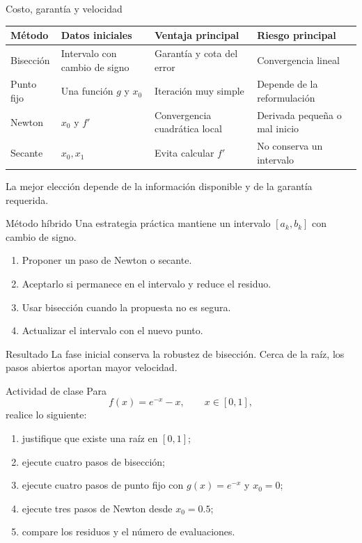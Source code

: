 \documentclass[aspectratio=169,12pt]{beamer}
\begin{document}
\begin{frame}{Costo, garantía y velocidad}
\centering
\small
\begin{tabular}{p{2.2cm}p{2.5cm}p{2.6cm}p{2.6cm}}
\toprule
Método & Datos iniciales & Ventaja principal & Riesgo principal \\
\midrule
Bisección & Intervalo con cambio de signo & Garantía y cota del error & Convergencia lineal \\
Punto fijo & Una función $g$ y $x_0$ & Iteración muy simple & Depende de la reformulación \\
Newton & $x_0$ y $f'$ & Convergencia cuadrática local & Derivada pequeña o mal inicio \\
Secante & $x_0,x_1$ & Evita calcular $f'$ & No conserva un intervalo \\
\bottomrule
\end{tabular}
\normalsize
\vspace{0.35cm}

La mejor elección depende de la información disponible y de la garantía requerida.
\end{frame}

\begin{frame}{Método híbrido}
Una estrategia práctica mantiene un intervalo $[a_k,b_k]$ con cambio de signo.
\begin{enumerate}
  \item Proponer un paso de Newton o secante.
  \item Aceptarlo si permanece en el intervalo y reduce el residuo.
  \item Usar bisección cuando la propuesta no es segura.
  \item Actualizar el intervalo con el nuevo punto.
\end{enumerate}
\begin{block}{Resultado}
La fase inicial conserva la robustez de bisección. Cerca de la raíz, los pasos
abiertos aportan mayor velocidad.
\end{block}
\end{frame}

\begin{frame}{Actividad de clase}
Para
\[
f(x)=e^{-x}-x,
\qquad x\in[0,1],
\]
realice lo siguiente:
\begin{enumerate}
  \item justifique que existe una raíz en $[0,1]$;
  \item ejecute cuatro pasos de bisección;
  \item ejecute cuatro pasos de punto fijo con $g(x)=e^{-x}$ y $x_0=0$;
  \item ejecute tres pasos de Newton desde $x_0=0.5$;
  \item compare los residuos y el número de evaluaciones.
\end{enumerate}
\end{frame}
\end{document}
